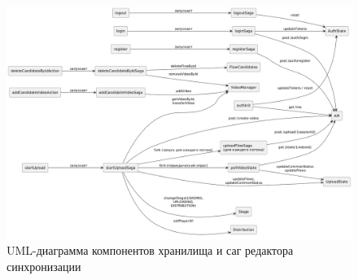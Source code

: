 	\begin{figure}[ht!] 
		\center
		\includegraphics [scale=0.33] {my_folder/images//uml_sync_sagas_store}
		\caption{UML-диаграмма компонентов хранилища и саг редактора синхронизации} 
		\label{fig:uml_sync_sagas_store}  
	\end{figure}
	